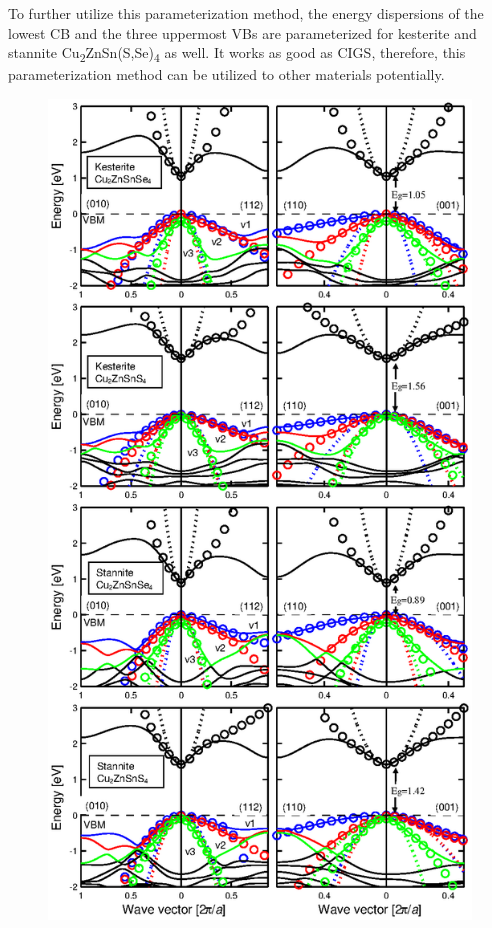 \documentclass[a4paper, 12pt, titlepage,oneside,drop]{kthesis}
\begin{document}
To further utilize this parameterization method, the energy dispersions of the lowest CB and the three uppermost VBs are parameterized for kesterite and stannite Cu\textsubscript{2}ZnSn(S,Se)\textsubscript{4} as well. It works as 
good as CIGS, therefore, this parameterization method can be utilized to other materials potentially.

\begin{figure}[H]
 \captionsetup{width=1\textwidth}
    \begin{center}
            \includegraphics[width=1\textwidth,clip]{bandstr}

\end{center}
\end{figure}
\end{document}

